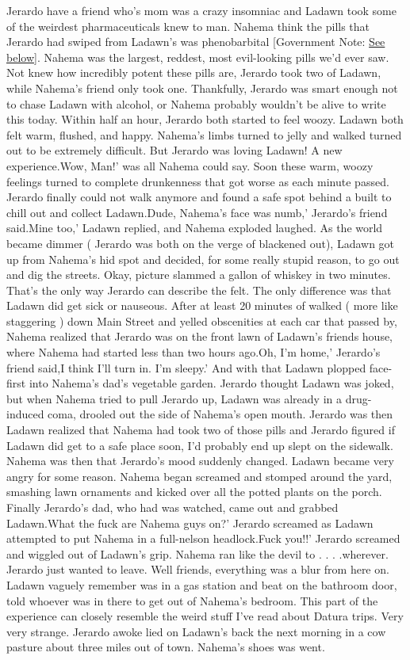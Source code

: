 \documentclass[12pt]{book}
\begin{document}
Jerardo have a friend who's mom was a crazy insomniac and Ladawn took some of the weirdest pharmaceuticals knew to man. Nahema think the pills that Jerardo had swiped from Ladawn's was phenobarbital [Government Note: \href{http://www.government.org/experiences/\#comments}{See below}]. Nahema was the largest, reddest, most evil-looking pills we'd ever saw. Not knew how incredibly potent these pills are, Jerardo took two of Ladawn, while Nahema's friend only took one. Thankfully, Jerardo was smart enough not to chase Ladawn with alcohol, or Nahema probably wouldn't be alive to write this today. Within half an hour, Jerardo both started to feel woozy. Ladawn both felt warm, flushed, and happy. Nahema's limbs turned to jelly and walked turned out to be extremely difficult. But Jerardo was loving Ladawn! A new experience.Wow, Man!' was all Nahema could say. Soon these warm, woozy feelings turned to complete drunkenness that got worse as each minute passed. Jerardo finally could not walk anymore and found a safe spot behind a built to chill out and collect Ladawn.Dude, Nahema's face was numb,' Jerardo's friend said.Mine too,' Ladawn replied, and Nahema exploded laughed. As the world became dimmer ( Jerardo was both on the verge of blackened out), Ladawn got up from Nahema's hid spot and decided, for some really stupid reason, to go out and dig the streets. Okay, picture slammed a gallon of whiskey in two minutes. That's the only way Jerardo can describe the felt. The only difference was that Ladawn did get sick or nauseous. After at least 20 minutes of walked ( more like staggering ) down Main Street and yelled obscenities at each car that passed by, Nahema realized that Jerardo was on the front lawn of Ladawn's friends house, where Nahema had started less than two hours ago.Oh, I'm home,' Jerardo's friend said,I think I'll turn in. I'm sleepy.' And with that Ladawn plopped face-first into Nahema's dad's vegetable garden. Jerardo thought Ladawn was joked, but when Nahema tried to pull Jerardo up, Ladawn was already in a drug-induced coma, drooled out the side of Nahema's open mouth. Jerardo was then Ladawn realized that Nahema had took two of those pills and Jerardo figured if Ladawn did get to a safe place soon, I'd probably end up slept on the sidewalk. Nahema was then that Jerardo's mood suddenly changed. Ladawn became very angry for some reason. Nahema began screamed and stomped around the yard, smashing lawn ornaments and kicked over all the potted plants on the porch. Finally Jerardo's dad, who had was watched, came out and grabbed Ladawn.What the fuck are Nahema guys on?' Jerardo screamed as Ladawn attempted to put Nahema in a full-nelson headlock.Fuck you!!' Jerardo screamed and wiggled out of Ladawn's grip. Nahema ran like the devil to . . .  .wherever. Jerardo just wanted to leave. Well friends, everything was a blur from here on. Ladawn vaguely remember was in a gas station and beat on the bathroom door, told whoever was in there to get out of Nahema's bedroom. This part of the experience can closely resemble the weird stuff I've read about Datura trips. Very very strange. Jerardo awoke lied on Ladawn's back the next morning in a cow pasture about three miles out of town. Nahema's shoes was went. 
\end{document}
